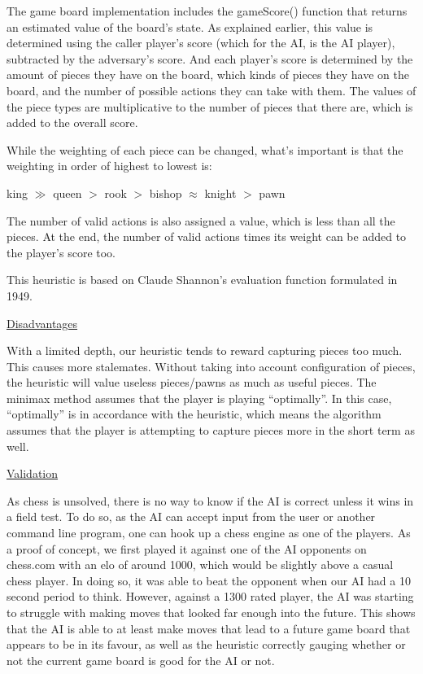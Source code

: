\documentclass[12pt, letterpaper]{article}
\begin{document}
\medskip

The game board implementation includes the gameScore() function that returns an estimated value of the
board's state. As explained earlier, this value is determined using the caller player's score
(which for the AI, is the AI player), subtracted by the adversary's score. And each player's score is
determined by the amount of pieces they have on the board, which kinds of pieces they have on the board,
and the number of possible actions they can take with them. The values of the piece types are
multiplicative to the number of pieces that there are, which is added to the overall score.

\medskip

While the weighting of each piece can be changed, what's important is that the weighting in order of highest to lowest is:

\begin{center}
  king $\gg$ queen $>$ rook $>$ bishop $\approx$ knight $>$ pawn
\end{center}

\medskip

The number of valid actions is also assigned a value, which is less than all the pieces.
At the end, the number of valid actions times its weight can be added to the player's score too.

\medskip

This heuristic is based on Claude Shannon's evaluation function formulated in 1949.

\medskip

\underline{Disadvantages}

\medskip

With a limited depth, our heuristic tends to reward capturing pieces too much. This causes more stalemates.
Without taking into account configuration of pieces, the heuristic will value useless pieces/pawns as much as useful pieces.
The minimax method assumes that the player is playing “optimally”. In this case, “optimally” is in accordance
with the heuristic, which means the algorithm assumes that the player is attempting to capture pieces more in
the short term as well.

\medskip

\underline{Validation}

\medskip

As chess is unsolved, there is no way to know if the AI is correct unless it wins in a field test.
To do so, as the AI can accept input from the user or another command line program, one can hook up a
chess engine as one of the players. As a proof of concept, we first played it against one of the AI
opponents on chess.com with an elo of around 1000, which would be slightly above a casual chess player.
In doing so, it was able to beat the opponent when our AI had a 10 second period to think. However,
against a 1300 rated player, the AI was starting to struggle with making moves that looked far enough
into the future. This shows that the AI is able to at least make moves that lead to a future game board
that appears to be in its favour, as well as the heuristic correctly gauging whether or not the current
game board is good for the AI or not.
\end{document}
